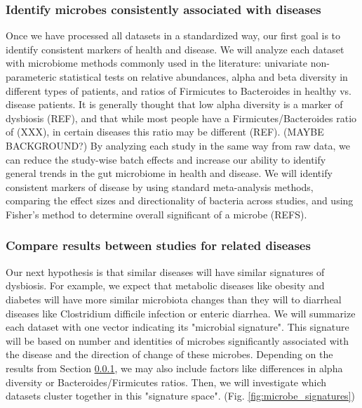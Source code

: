 \documentclass[12pt]{article}
\begin{document}
\subsubsection{Identify microbes consistently associated with diseases}\label{sec:indep_studies}
Once we have processed all datasets in a standardized way, our first goal is to identify consistent markers of health and disease. We will analyze each dataset with microbiome methods commonly used in the literature: univariate non-parameteric statistical tests on relative abundances, alpha and beta diversity in different types of patients, and ratios of Firmicutes to Bacteroides in healthy vs. disease patients. It is generally thought that low alpha diversity is a marker of dysbiosis (REF), and that while most people have a Firmicutes/Bacteroides ratio of (XXX), in certain diseases this ratio may be different (REF). (MAYBE BACKGROUND?) By analyzing each study in the same way from raw data, we can reduce the study-wise batch effects and increase our ability to identify general trends in the gut microbiome in health and disease. We will identify consistent markers of disease by using standard meta-analysis methods, comparing the effect sizes and directionality of bacteria across studies, and using Fisher's method to determine overall significant of a microbe (REFS). 

\subsubsection{Compare results between studies for related diseases}\label{sec:signatures}
Our next hypothesis is that similar diseases will have similar signatures of dysbiosis. For example, we expect that metabolic diseases like obesity and diabetes will have more similar microbiota changes than they will to diarrheal diseases like Clostridium difficile infection or enteric diarrhea. We will summarize each dataset with one vector indicating its "microbial signature". This signature will be based on number and identities of microbes significantly associated with the disease and the direction of change of these microbes. Depending on the results from Section \ref{sec:indep_studies}, we may also include factors like differences in alpha diversity or Bacteroides/Firmicutes ratios. Then, we will investigate which datasets cluster together in this "signature space". (Fig. \ref{fig:microbe_signatures})
\end{document}
